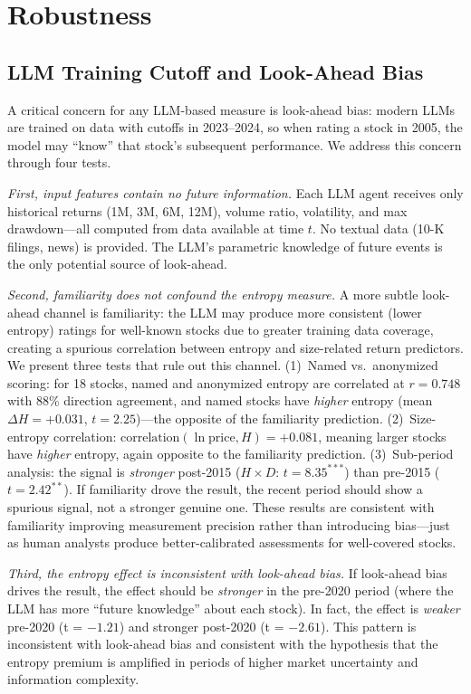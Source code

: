 \documentclass[12pt,a4paper]{article}
\begin{document}
\section{Robustness}\label{sec:robust}

\subsection{LLM Training Cutoff and Look-Ahead Bias}

A critical concern for any LLM-based measure is look-ahead bias: modern LLMs are trained on data with cutoffs in 2023--2024, so when rating a stock in 2005, the model may ``know'' that stock's subsequent performance. We address this concern through four tests.

\textit{First, input features contain no future information.} Each LLM agent receives only historical returns (1M, 3M, 6M, 12M), volume ratio, volatility, and max drawdown---all computed from data available at time $t$. No textual data (10-K filings, news) is provided. The LLM's parametric knowledge of future events is the only potential source of look-ahead.

\textit{Second, familiarity does not confound the entropy measure.} A more subtle look-ahead channel is familiarity: the LLM may produce more consistent (lower entropy) ratings for well-known stocks due to greater training data coverage, creating a spurious correlation between entropy and size-related return predictors. We present three tests that rule out this channel. (1)~Named vs.~anonymized scoring: for 18 stocks, named and anonymized entropy are correlated at $r = 0.748$ with 88\% direction agreement, and named stocks have \textit{higher} entropy (mean $\Delta H = +0.031$, $t = 2.25$)---the opposite of the familiarity prediction. (2)~Size-entropy correlation: $\text{correlation}(\ln \text{price}, H) = +0.081$, meaning larger stocks have \textit{higher} entropy, again opposite to the familiarity prediction. (3)~Sub-period analysis: the signal is \textit{stronger} post-2015 ($H \times D$: $t = 8.35^{***}$) than pre-2015 ($t = 2.42^{**}$). If familiarity drove the result, the recent period should show a spurious signal, not a stronger genuine one. These results are consistent with familiarity improving measurement precision rather than introducing bias---just as human analysts produce better-calibrated assessments for well-covered stocks.

\textit{Third, the entropy effect is inconsistent with look-ahead bias.} If look-ahead bias drives the result, the effect should be \textit{stronger} in the pre-2020 period (where the LLM has more ``future knowledge'' about each stock). In fact, the effect is \textit{weaker} pre-2020 (t = $-1.21$) and stronger post-2020 (t = $-2.61$). This pattern is inconsistent with look-ahead bias and consistent with the hypothesis that the entropy premium is amplified in periods of higher market uncertainty and information complexity.
\end{document}
